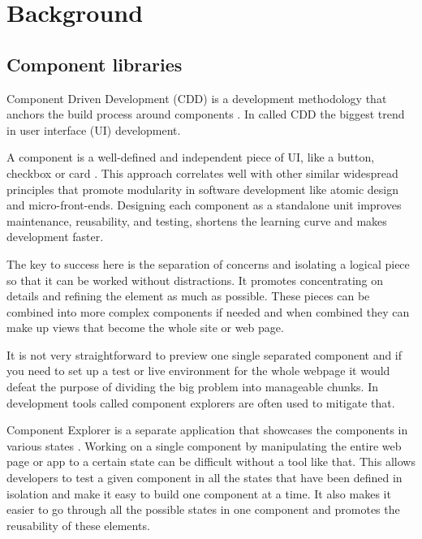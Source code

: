 \documentclass{master_thesis}
\begin{document}
\section{Background}



\subsection{Component libraries}

Component Driven Development (CDD) is a development methodology that anchors the build process around components \citep{Coleman2017}. In \citeyear{Coleman2017} \citeauthor{Coleman2017} called CDD the biggest trend in user interface (UI) development.

A component is a well-defined and independent piece of UI, like a button, checkbox or card \citep{Ella2019}. This approach correlates well with other similar widespread principles that promote modularity in software development like atomic design and micro-front-ends. Designing each component as a standalone unit improves maintenance, reusability, and testing, shortens the learning curve and makes development faster.

The key to success here is the separation of concerns and isolating a logical piece so that it can be worked without distractions. It promotes concentrating on details and refining the element as much as possible. These pieces can be combined into more complex components if needed and when combined they can make up views that become the whole site or web page.

It is not very straightforward to preview one single separated component and if you need to set up a test or live environment for the whole webpage it would defeat the purpose of dividing the big problem into manageable chunks. In development tools called component explorers are often used to mitigate that.

Component Explorer is a separate application that showcases the components in various states \citep{Coleman2017}. Working on a single component by manipulating the entire web page or app to a certain state can be difficult without a tool like that. This allows developers to test a given component in all the states that have been defined in isolation and make it easy to build one component at a time. It also makes it easier to go through all the possible states in one component and promotes the reusability of these elements.
\end{document}

